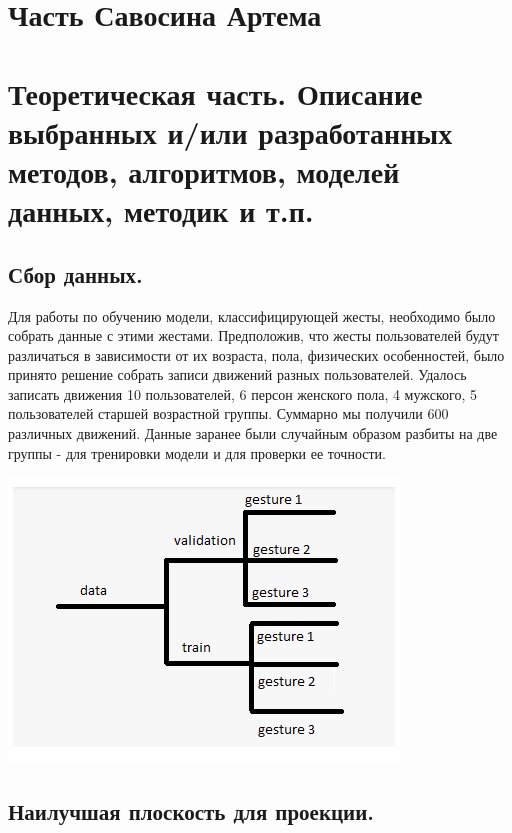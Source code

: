 
\section*{Часть Савосина Артема}

\section*{Теоретическая часть. Описание выбранных и/или разработанных методов, алгоритмов, моделей данных, методик и т.п.}

\subsection*{Сбор данных.}
Для работы по обучению модели, классифицирующей жесты, необходимо было собрать данные с этими жестами. Предположив, что жесты пользователей будут различаться в зависимости от их возраста, пола, физических особенностей, было принято решение собрать записи движений разных пользователей. Удалось записать движения 10 пользователей, 6 персон женского пола, 4 мужского, 5 пользователей старшей возрастной группы.
Суммарно мы получили 600 различных движений.
Данные заранее были случайным образом разбиты на две группы - для тренировки модели и для проверки ее точности.

\includegraphics[scale = 1]{images_sav/data.png}

\subsection*{Наилучшая плоскость для проекции.}


